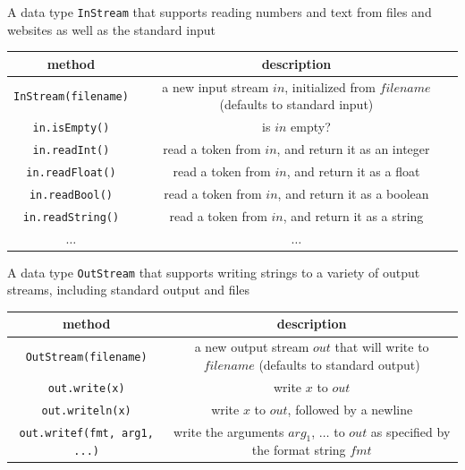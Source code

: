 \documentclass[8pt,a4paper,compress]{beamer}
\begin{document}
\begin{frame}[fragile]
\pause

A data type \lstinline{InStream} that supports reading numbers and text from files and websites as well as the standard input
\begin{center}
\begin{tabular}{cc}
method & description \\ \hline
\lstinline$InStream(filename)$ & \makecell{a new input stream $in$, initialized \\ from $filename$ (defaults to standard input)} \\
\lstinline$in.isEmpty()$ & is $in$ empty? \\
\lstinline$in.readInt()$ & read a token from $in$, and return it as an integer \\
\lstinline$in.readFloat()$ & read a token from $in$, and return it as a float \\
\lstinline$in.readBool()$ & read a token from $in$, and return it as a boolean \\
\lstinline$in.readString()$ & read a token from $in$, and return it as a string \\
$\dots$ & $\dots$
\end{tabular} 
\end{center}

\pause
\bigskip

A data type \lstinline{OutStream} that supports writing strings to a variety of output streams, including standard output and files
\begin{center}
\begin{tabular}{cc}
method & description \\ \hline
\lstinline$OutStream(filename)$ & \makecell{a new output stream $out$ that will write \\ to $filename$ (defaults to standard output)} \\
\lstinline$out.write(x)$ & write $x$ to $out$ \\
\lstinline$out.writeln(x)$ & write $x$ to $out$, followed by a newline \\
\lstinline$out.writef(fmt, arg1, ...)$ & \makecell{write the arguments $arg_1$, $\dots$ to $out$ as \\ specified by the format string $fmt$}
\end{tabular} 
\end{center}
\end{frame}
\end{document}
